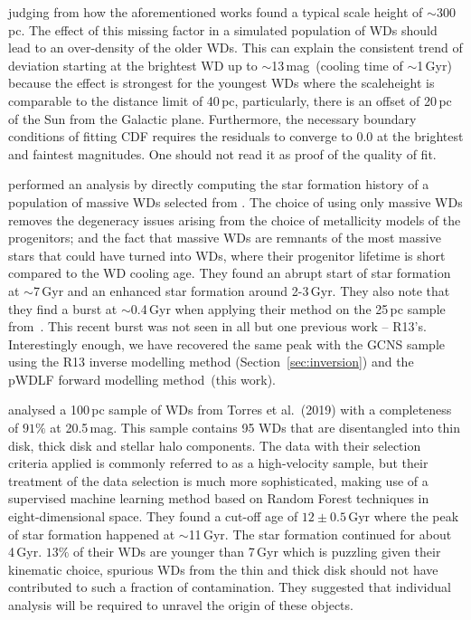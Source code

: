 \documentclass[fleqn,usenatbib]{mnras}
\begin{document}
judging from how the aforementioned works found a typical scale height of
$\sim$300\,pc. The effect of this missing factor in a simulated population of
WDs should lead to an over-density of the older WDs. This can explain the
consistent trend of deviation starting at the brightest WD up to
$\sim$13\,mag~(cooling time of $\sim$1\,Gyr) because the effect is strongest
for the youngest WDs where the scaleheight is comparable to the distance limit
of 40\,pc, particularly, there is an offset of 20\,pc of the Sun from the
Galactic plane. Furthermore, the necessary boundary conditions of fitting
CDF requires the residuals to converge to 0.0 at the brightest and faintest
magnitudes. One should not read it as proof of the quality of fit.

\citet{2019ApJ...878L..11I} performed an analysis by directly
computing the star formation history of a population of massive WDs selected
from \citet{2019Natur.565..202T}. The choice of using only massive WDs
removes the degeneracy issues arising from the choice of metallicity models
of the progenitors; and the fact that massive WDs are remnants of the most
massive stars that could have turned into WDs, where their progenitor lifetime
is short compared to the WD cooling age. They found an abrupt start of star
formation at $\sim$7\,Gyr and an enhanced star formation around 2-3\,Gyr. They
also note that they find a burst at $\sim$0.4\,Gyr when applying their method
on the 25\,pc sample from~\citet{2017ASPC..509...59O}. This recent burst was not
seen in all but one previous work -- R13's. Interestingly enough, we have
recovered the same peak with the GCNS sample using the R13 inverse
modelling method (Section~\ref{sec:inversion}) and the pWDLF forward modelling
method~(this work). 

\citet{2021MNRAS.502.1753T} analysed a 100\,pc sample of WDs from
Torres et al.~(2019) with a completeness of $91\%$ at 20.5\,mag. This sample
contains 95 WDs that are disentangled into thin disk, thick disk and stellar
halo components. The data with their selection criteria applied is commonly
referred to as a high-velocity sample, but their treatment of the data
selection is much more sophisticated, making use of a supervised
machine learning method based on Random Forest techniques in eight-dimensional
space. They found a cut-off age of $12\pm0.5$\,Gyr where the peak of star
formation happened at $\sim$11\,Gyr. The star formation continued for about
4\,Gyr. $13\%$ of their WDs are younger than 7\,Gyr which is puzzling given
their kinematic choice, spurious WDs from the thin and thick disk should not
have contributed to such a fraction of contamination. They suggested that
individual analysis will be required to unravel the origin of these objects.
\end{document}
